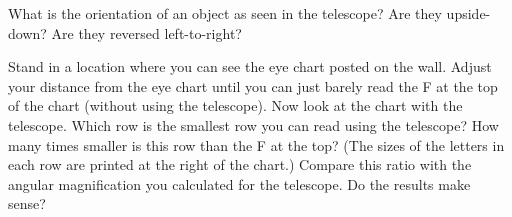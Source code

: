 What is the orientation of an object as seen in the telescope?  Are
they upside-down?  Are they reversed left-to-right?

\vskip 1in

Stand in a location where you can see the eye chart posted on the wall.
Adjust your distance from the eye chart until you can just barely
read the F at the top of the chart (without using the telescope).
Now look at the chart with the telescope.  Which row is the
smallest row you can read using the telescope?  How many times
smaller is this row than the F at the top?  (The sizes of the letters
in each row are printed at the right of the chart.)
Compare this ratio with the angular magnification you calculated
for the telescope.  Do the results make sense?




